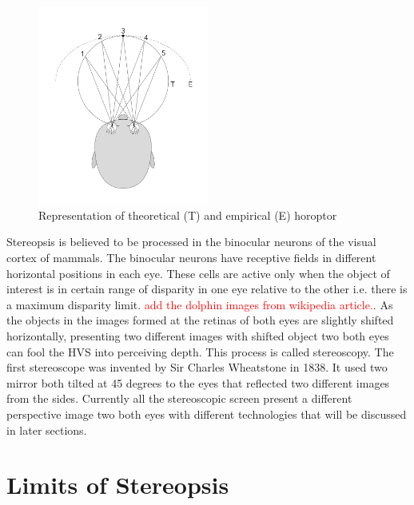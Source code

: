 \begin{figure}
\centering
    \includegraphics[width=0.5\textwidth]{./Template_Figures/horopter}
    \caption{Representation of theoretical (T) and empirical (E) horoptor\label{fig:horoptor}}
\end{figure}

Stereopsis is believed to be processed in the binocular neurons of the visual cortex of mammals. The binocular neurons have receptive fields in different horizontal positions in each eye. These cells are active only when the object of interest is in certain range of disparity in one eye relative to the other i.e. there is a maximum disparity limit. \textcolor{red}{add the dolphin images from wikipedia article.}. As the objects in the images formed at the retinas of both eyes are slightly shifted horizontally, presenting two different images with shifted object two both eyes can fool the HVS into perceiving depth. This process is called stereoscopy. The first stereoscope was invented by Sir Charles Wheatstone in 1838\cite{ wiki:wheatstone}. It used two mirror both tilted at 45 degrees to the eyes that reflected two different images from the sides. Currently all the stereoscopic screen present a different perspective image two both eyes with different technologies that will be discussed in later sections.

\section{Limits of Stereopsis}









